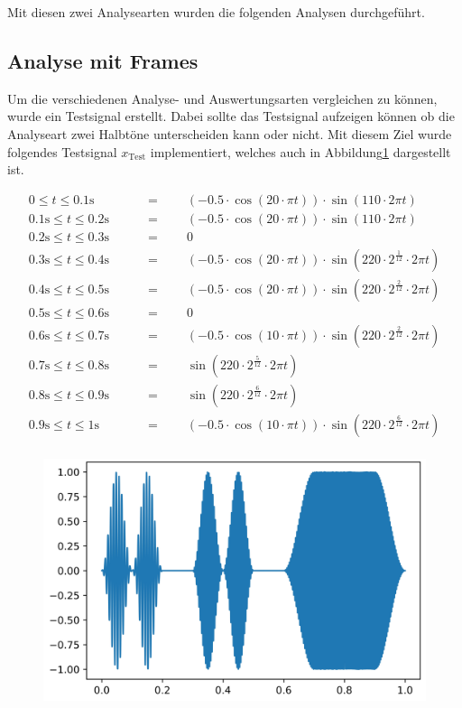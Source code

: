 Mit diesen zwei Analysearten wurden die folgenden Analysen durchgeführt.

\subsection{Analyse mit Frames}

Um die verschiedenen Analyse- und Auswertungsarten vergleichen zu können, wurde ein Testsignal erstellt. Dabei sollte das Testsignal aufzeigen können ob die Analyseart zwei Halbtöne unterscheiden kann oder nicht. Mit diesem Ziel wurde folgendes Testsignal $x_{\text{Test}}$ implementiert, welches auch in Abbildung\ref{fig:frame-testsig} dargestellt ist.


\begin{align*}
0 \leq t \leq 0.1\text{s} \qquad			& = \qquad (-0.5\cdot \cos(20\cdot\pi t))\cdot \sin(110\cdot 2\pi t) \\
0.1\text{s} \leq t \leq 0.2\text{s}\qquad	& = \qquad (-0.5\cdot \cos(20\cdot\pi t))\cdot \sin(110\cdot 2\pi t) \\
0.2\text{s} \leq t \leq 0.3\text{s}\qquad	& = \qquad 0\\
0.3\text{s} \leq t \leq 0.4\text{s}\qquad	& = \qquad (-0.5\cdot \cos(20\cdot\pi t))\cdot \sin(220\cdot  2^{\frac{1}{12}}\cdot 2\pi t) \\
0.4\text{s} \leq t \leq 0.5\text{s}\qquad	& = \qquad (-0.5\cdot \cos(20\cdot\pi t))\cdot \sin(220\cdot2^{\frac{2}{12}}\cdot 2\pi t) \\
0.5\text{s} \leq t \leq 0.6\text{s}\qquad	& = \qquad 0 \\
0.6\text{s} \leq t \leq 0.7\text{s}\qquad	& = \qquad (-0.5\cdot \cos(10\cdot\pi t))\cdot \sin(220\cdot2^{\frac{2}{12}}\cdot 2\pi t) \\
0.7\text{s} \leq t \leq 0.8\text{s}\qquad	& = \qquad \sin(220\cdot2^{\frac{5}{12}}\cdot 2\pi t) \\
0.8\text{s} \leq t \leq 0.9\text{s}\qquad	& = \qquad \sin(220\cdot2^{\frac{6}{12}}\cdot 2\pi t) \\
0.9\text{s} \leq t \leq 1\text{s}\qquad		& = \qquad (-0.5\cdot \cos(10\cdot\pi t))\cdot \sin(220\cdot2^{\frac{6}{12}}\cdot 2\pi t) \\
\end{align*}

\begin{figure}
\centering
\includegraphics[width=0.8\columnwidth]{papers/autotune/sections/frames/images/testsig.jpg}
\label{fig:frame-testsig}
\end{figure}%

